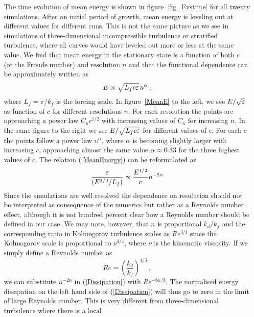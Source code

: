 The time evolution of mean energy is shown in figure~\ref{fig_Evstime} for all
twenty simulations. After an initial period of growth, mean energy is leveling
out at different values for different runs. This is not the same picture as we
see in simulations of three-dimensional incompressible turbulence or stratified
turbulence, where all curves would have leveled out more or less at the same
value. We find that mean energy in the stationary state is a function of both $
c $ (or the Froude number) and resolution $ n $ and that the functional
dependence can be approximately written as
\begin{equation} \label{MeanEnergy}
E \propto \sqrt{L_f c \varepsilon} \, n^{\alpha}  \, ,
\end{equation}
where $ L_f = \pi/k_f $ is the forcing scale. In figure~\ref{MeanE} to the
left, we see $ E/\sqrt{\varepsilon} $ as function of $ c $ for different resolutions $
n $. For each resolution the points are approaching a power law $ C_n c^{1/2} $
with increasing values of $ C_n $ for increasing $ n $. In the same figure to
the right we see $ E/\sqrt{L_f c \varepsilon} $ for different values of $ c $. For
each $ c $ the points follow a power law $ n^{\alpha} $, where $ \alpha $ is
becoming slightly larger with increasing $ c $, approaching almost the same
value $ \alpha \approx 0.33 $ for the three highest values of $ c $. The
relation (\ref{MeanEnergy}) can be reformulated as
\begin{equation} \label{Dissipation}
\frac{\varepsilon} {(E^{3/2} / L_f)} \propto \frac{E^{1/2}}{c} n^{-2\alpha}
\end{equation}
Since the simulations are well resolved the dependence on resolution should not
be interpreted as consequence of the numerics but rather as a Reynolds number
effect, although it is not hundred percent clear how a Reynolds number should
be defined in our case. We may note, however, that $ n $ is proportional $
k_{d} / k_f $ and the corresponding ratio in Kolmogorov turbulence scales as $
Re^{3/4} $ since the Kolmogorov scale is proportional to $ \nu^{3/4} $, where $
\nu $ is the kinematic viscosity. If we simply define a Reynolds number as
\begin{equation}
Re = \left ( \frac{k_d} {k_f} \right )^{4/3} \, ,
\end{equation}
we can substitute $ n^{-2\alpha} $ in (\ref{Dissipation}) with $ Re^{-8
\alpha/3} $. The normalised energy dissipation on the left hand side of
(\ref{Dissipation}) will thus go to zero in the limit of large Reynolds number.
This is very different from three-dimensional turbulence where there is a local
